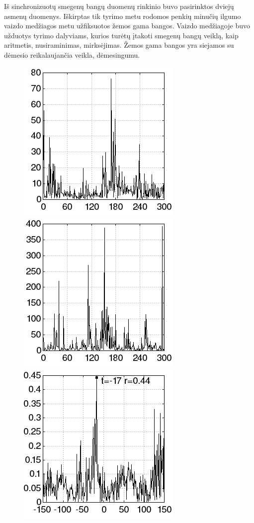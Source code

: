 Iš sinchronizuotų smegenų bangų duomenų\cite{brainwaves} rinkinio buvo pasirinktos dviejų asmenų duomenys.
Iškirptas tik tyrimo metu rodomos penkių minučių ilgumo vaizdo medžiagos metu užfiksuotos žemos gama bangos.
Vaizdo medžiagoje buvo užduotys tyrimo dalyviams, kurios turėtų įtakoti smegenų bangų veiklą, kaip aritmetis, nusiraminimas, mirksėjimas.
Žemos gama bangos yra siejamos su dėmesio reikalaujančia veikla, dėmesingumu.

\begin{figure}
    \includegraphics[scale=0.65]{../scripts/brainwaves/wave1.png}
    \includegraphics[scale=0.65]{../scripts/brainwaves/wave2.png}
    \includegraphics[scale=0.65]{../scripts/brainwaves/result.png}

\end{figure}
